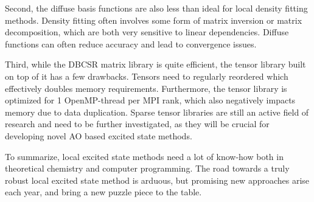 Second, the diffuse basis functions are also less than ideal for local density fitting methods. Density fitting often involves some form of matrix inversion or matrix decomposition, which are both very sensitive to linear dependencies. Diffuse functions can often reduce accuracy and lead to convergence issues. 

Third, while the DBCSR matrix library is quite efficient, the tensor library built on top of it has a few drawbacks. Tensors need to regularly reordered which effectively doubles memory requirements. Furthermore, the tensor library is optimized for 1 OpenMP-thread per MPI rank, which also negatively impacts memory due to data duplication. Sparse tensor libraries are still an active field of research and need to be further investigated, as they will be crucial for developing novel AO based excited state methods.

To summarize, local excited state methods need a lot of know-how both in theoretical chemistry and computer programming. The road towards a truly robust local excited state method is arduous, but promising new approaches arise each year, and bring a new puzzle piece to the table.
